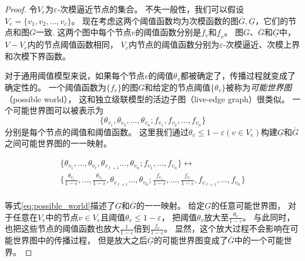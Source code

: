 \begin{proof}
令$V_e$为$\varepsilon$-次模逼近节点的集合。
不失一般性，我们可以假设$V_e = \{v_1,v_2,\dots,v_c\}$。
现在考虑这两个阈值函数均为次模函数的图$\overline{G}, \underline{G}$，它们的节点和图$G$一致.
这两个图中每个节点$v$的阈值函数分别是$\overline{f}_v$和$\underline{f}_v$。
图$G$、$\overline{G}$和$\underline{G}$中，$V-V_e$内的节点阈值函数相同，
$V_e$内节点的阈值函数分别为$\varepsilon$-次模逼近、次模上界和次模下界函数。

对于通用阈值模型来说，如果每个节点$v$的阈值$\theta_v$都被确定了，传播过程就变成了确定性的。
一个阈值函数为$\{f_v\}$的图$G$和给定的节点阈值$\{\theta_v\}$被称为{\it 可能世界图}（possible world），
这和独立级联模型的活边子图（live-edge graph）很类似。
一个可能世界图可以被表示为
$$\{\theta_{v_1},\theta_{v_2},\dots,\theta_{v_n};f_{v_1},f_{v_2},\dots,f_{v_n}\}$$
分别是每个节点的阈值和阈值函数。
这里我们通过$\theta_{v}\leq 1-\varepsilon (v\in V_e)$构建$\underline{G}$和$\overline{G}$之间可能世界图的一一映射。

\begin{equation}
\label{eq:possible_world}
\begin{array}{ll}
\{\theta_{v_1},\dots,\theta_{v_{\ell}},\theta_{v_{\ell+1}}\dots,\theta_{v_n};
f_{v_1}, \dots,f_{v_n}\} \leftrightarrow \\
\{\frac{\theta_{v_1}}{1-\varepsilon},\dots,\frac{\theta_{v_{\ell}}}{1-\varepsilon},\theta_{v_{\ell+1}}\dots,\theta_{v_n};
\frac{f_{v_1}}{1-\varepsilon},\dots,\frac{f_{v_{\ell}}}{1-\varepsilon},f_{v_{\ell+1}},\dots,f_{v_n}\} \\
\end{array}
\end{equation}

等式\ref{eq:possible_world}描述了$\underline{G}$和$\overline{G}$的一一映射。
给定$\underline{G}$的任意可能世界图，
对于任意在$V_e$中的节点$v\in V_e$且阈值$\theta_{v}\leq 1-\varepsilon$，
把阈值$\theta_{v}$放大至$\frac{\theta_{v}}{1-\varepsilon}$。
与此同时，也把这些节点的阈值函数也放大$\frac{1}{1-\varepsilon}$倍到$\frac{f_{v}}{1-\varepsilon}$。
显然，这个放大过程不会影响在可能世界图中的传播过程，
但是放大之后$\underline{G}$的可能世界图变成了$\overline{G}$中的一个可能世界。


\end{proof}

